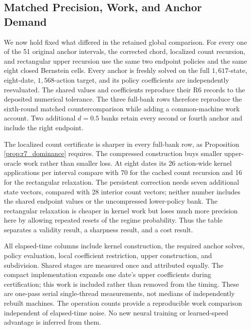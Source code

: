 \subsection{Matched Precision, Work, and Anchor Demand}
\label{sec:r7_matched_evidence}
We now hold fixed what differed in the retained global comparison. For every one of the 51 original anchor intervals, the corrected chord, localized count recursion, and rectangular upper recursion use the same two endpoint policies and the same eight closed Bernstein cells. Every anchor is freshly solved on the full $1,617$-state, eight-date, $1,568$-action target, and its policy coefficients are independently reevaluated. The shared values and coefficients reproduce their R6 records to the deposited numerical tolerance. The three full-bank rows therefore reproduce the sixth-round matched countercomparison while adding a common-machine work account. Two additional $d=0.5$ banks retain every second or fourth anchor and include the right endpoint.


The localized count certificate is sharper in every full-bank row, as Proposition \ref{prop:r7_dominance} requires. The compressed construction buys smaller upper-oracle work rather than smaller loss. At eight dates its 26 action-wide kernel applications per interval compare with 70 for the cached count recursion and 16 for the rectangular relaxation. The persistent correction needs seven additional state vectors, compared with 28 interior count vectors; neither number includes the shared endpoint values or the uncompressed lower-policy bank. The rectangular relaxation is cheaper in kernel work but loses much more precision here by allowing repeated resets of the regime probability. Thus the table separates a validity result, a sharpness result, and a cost result.

All elapsed-time columns include kernel construction, the required anchor solves, policy evaluation, local coefficient restriction, upper construction, and subdivision. Shared stages are measured once and attributed equally. The compact implementation expands one date's upper coefficients during certification; this work is included rather than removed from the timing. These are one-pass serial single-thread measurements, not medians of independently rebuilt machines. The operation counts provide a reproducible work comparison independent of elapsed-time noise. No new neural training or learned-speed advantage is inferred from them.

